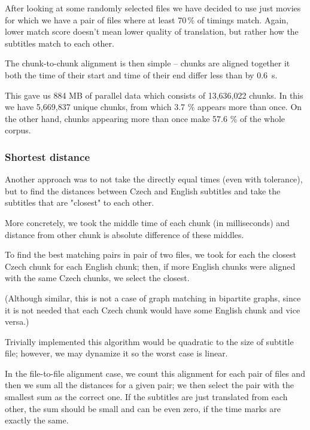 
After looking at some randomly selected files we have decided to use just movies for which we have a pair of files where at least 70\,\% of timings match. Again, lower match score doesn't mean lower quality of translation, but rather how the subtitles match to each other. 

The chunk-to-chunk alignment is then simple -- chunks are aligned together it both the time of their start and time of their end differ less than by 0.6\ s.

This gave us 884 MB of parallel data which consists of 13,636,022 chunks. In this we have 5,669,837 unique chunks, from which 3.7 \% appears more than once. On the other hand, chunks appearing more than once make 57.6 \% of the whole corpus.

\subsubsection{Shortest distance}
Another approach was to not take the directly equal times (even with tolerance), but to find the distances between Czech and English subtitles and take the subtitles that are "closest" to each other.

More concretely, we took the middle time of each chunk (in milliseconds) and distance from other chunk is absolute difference of these middles. 

To find the best matching pairs in pair of two files, we took for each  the closest Czech chunk for each English chunk; then, if more English chunks were aligned with the same Czech chunks, we select the closest.

(Although similar, this is not a case of graph matching in bipartite graphs, since it is not needed that each Czech chunk would have some English chunk and vice versa.)

Trivially implemented this algorithm would be quadratic to the size of subtitle file; however, we may dynamize it so the worst case is linear.

In the file-to-file alignment case, we count this alignment for each pair of files and then we sum all the distances for a given pair; we then select the pair with the smallest sum as the correct one. If the subtitles are just translated from each other, the sum should be small and can be even zero, if the time marks are exactly the same.

